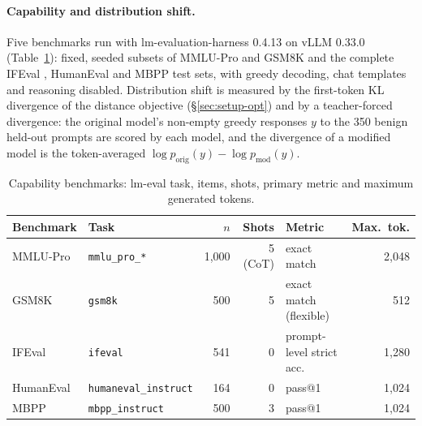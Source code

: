 \paragraph{Capability and distribution shift.} Five benchmarks run with
lm-evaluation-harness 0.4.13 \cite{gao2024language} on vLLM 0.33.0
(Table~\ref{tab:capability}): fixed, seeded subsets of MMLU-Pro
\cite{wang2024mmlupro} and GSM8K \cite{cobbe2021training} and the complete
IFEval \cite{zhou2023instruction}, HumanEval \cite{chen2021evaluating} and MBPP
\cite{austin2021program} test sets, with greedy decoding, chat templates and
reasoning disabled. Distribution shift is measured by the first-token KL
divergence of the distance objective (\S\ref{sec:setup-opt}) and by a
teacher-forced divergence: the original model's non-empty greedy responses $y$
to the 350 benign held-out prompts are scored by each model, and the divergence
of a modified model is the token-averaged
$\log p_{\mathrm{orig}}(y)-\log p_{\mathrm{mod}}(y)$.

\begin{table}[t]
\centering\small
\caption{Capability benchmarks: lm-eval task, items, shots, primary metric and
maximum generated tokens.}
\label{tab:capability}
\begin{tabular}{llrrlr}
\toprule
Benchmark & Task & $n$ & Shots & Metric & Max.\ tok. \\
\midrule
MMLU-Pro  & \texttt{mmlu\_pro\_*}        & 1{,}000 & 5 (CoT) & exact match & 2{,}048 \\
GSM8K     & \texttt{gsm8k}               & 500     & 5 & exact match (flexible) & 512 \\
IFEval    & \texttt{ifeval}              & 541     & 0 & prompt-level strict acc. & 1{,}280 \\
HumanEval & \texttt{humaneval\_instruct} & 164     & 0 & pass@1 & 1{,}024 \\
MBPP      & \texttt{mbpp\_instruct}      & 500     & 3 & pass@1 & 1{,}024 \\
\bottomrule
\end{tabular}
\end{table}

